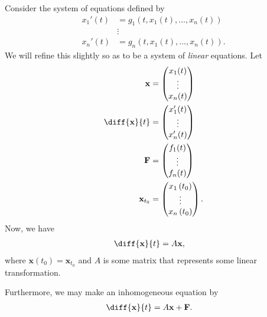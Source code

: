 \documentclass[10pt]{mypackage}
\begin{document}
\begin{example}
  Consider the system of equations defined by
  \begin{align*}
    x_1'(t) &= g_1\left( t,x_1(t),\dots,x_n(t) \right)\\
            &\vdots\\
    x_n'(t) &= g_n\left( t,x_1(t),\dots,x_n(t) \right).
  \end{align*}
  We will refine this slightly so as to be a system of \textit{linear} equations. Let
  \begin{align*}
    \mathbf{x} &= \begin{pmatrix}x_1(t)\\\vdots\\x_n(t)\end{pmatrix}\\
    \diff{\mathbf{x}}{t} &= \begin{pmatrix}x_1'(t)\\\vdots\\x_n'(t)\end{pmatrix}\\
    \mathbf{F} &= \begin{pmatrix}f_1(t) \\ \vdots \\ f_n(t)\end{pmatrix}\\
    \mathbf{x}_{t_0} &= \begin{pmatrix}x_1\left(t_0\right)\\\vdots\\x_n\left(t_0\right)\end{pmatrix}.
  \end{align*}
  Now, we have
  \begin{align*}
    \diff{\mathbf{x}}{t} &= A\mathbf{x},
  \end{align*}
  where $\mathbf{x}\left(t_0\right) = \mathbf{x}_{t_0}$ and $A$ is some matrix that represents some linear transformation.\newline

  Furthermore, we may make an inhomogeneous equation by
  \begin{align*}
    \diff{\mathbf{x}}{t} &= A\mathbf{x} + \mathbf{F}.
  \end{align*}
\end{example}
\end{document}
